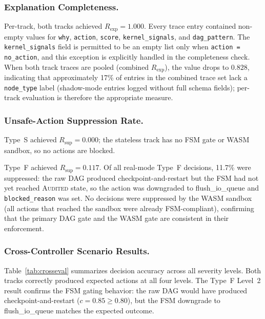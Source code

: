 \documentclass[runningheads]{llncs}
\begin{document}
\subsubsection{Explanation Completeness.}

Per-track, both tracks achieved $R_\text{exp} = 1.000$.  Every trace entry
contained non-empty values for \texttt{why}, \texttt{action},
\texttt{score}, \texttt{kernel\_signals}, and \texttt{dag\_pattern}.
The \texttt{kernel\_signals} field is permitted to be an empty list
only when \texttt{action = no\_action}, and this exception is
explicitly handled in the completeness check.  When both track traces
are pooled (combined $R_\text{exp}$), the value drops to $0.828$,
indicating that approximately 17\% of entries in the combined trace
set lack a \texttt{node\_type} label (shadow-mode entries logged
without full schema fields); per-track evaluation is therefore the
appropriate measure.

\subsubsection{Unsafe-Action Suppression Rate.}

Type~S achieved $R_\text{sup} = 0.000$; the stateless track has no
FSM gate or WASM sandbox, so no actions are blocked.

Type~F achieved $R_\text{sup} = 0.117$.  Of all real-mode Type~F
decisions, 11.7\% were suppressed: the raw DAG produced
checkpoint-and-restart but the FSM had not yet reached
\textsc{Audited} state, so the action was downgraded to
flush\_io\_queue and \texttt{blocked\_reason} was set.  No decisions
were suppressed by the WASM sandbox (all actions that reached the
sandbox were already FSM-compliant), confirming that the primary DAG
gate and the WASM gate are consistent in their enforcement.

\subsubsection{Cross-Controller Scenario Results.}

Table~\ref{tab:crosseval} summarizes decision accuracy across all
severity levels.  Both tracks correctly produced expected actions at
all four levels.  The Type~F Level~2 result confirms the FSM gating
behavior: the raw DAG would have produced checkpoint-and-restart
($c=0.85 \geq 0.80$), but the FSM downgrade to flush\_io\_queue
matches the expected outcome.
\end{document}
